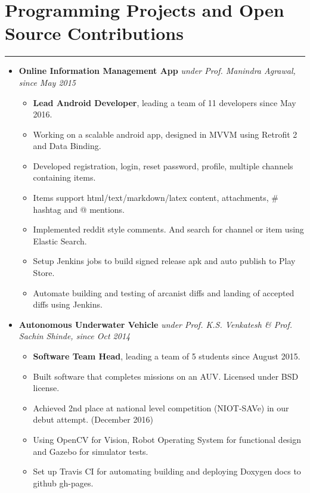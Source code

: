 \documentclass[a4paper]{article}
\begin{document}
\section*{Programming Projects and Open Source Contributions}
\hrule
\vspace{3mm}
\begin{itemize}
	\item
	      \textbf{Online Information Management App}
	      \hfill \textit{under Prof. Manindra Agrawal, since May 2015}
	      \begin{itemize}
	      	\vspace{-2mm} \setlength\itemsep{-0.2em}
		\item \textbf{Lead Android Developer}, leading a team of 11 developers since May 2016.
	      	\item Working on a scalable android app, designed in MVVM using Retrofit 2 and Data Binding.
	      	\item Developed registration, login, reset password, profile, multiple channels containing items.
	      	\item Items support html/text/markdown/latex content, attachments, \# hashtag and @ mentions.
	      	\item Implemented reddit style comments. And search for channel or item using Elastic Search.
	      	\item Setup Jenkins jobs to build signed release apk and auto publish to Play Store.
	      	\item Automate building and testing of arcanist diffs and landing of accepted diffs using Jenkins.
	      \end{itemize}
	\item
	      \textbf{Autonomous Underwater Vehicle}
	      \hfill \textit{under Prof. K.S. Venkatesh \& Prof. Sachin Shinde, since Oct 2014}
	      \begin{itemize}
	      	\vspace{-2mm} \setlength\itemsep{-0.2em}
		\item \textbf{Software Team Head}, leading a team of 5 students since August 2015.
		\item Built software that completes missions on an AUV. Licensed under BSD license.
		\item Achieved 2nd place at national level competition (NIOT-SAVe) in our debut attempt. (December 2016)
		\item Using OpenCV for Vision, Robot Operating System for functional design and Gazebo for simulator tests.
	      	\item Set up Travis CI for automating building and deploying Doxygen docs to github gh-pages.

\end{itemize}
\end{itemize}
\end{document}

